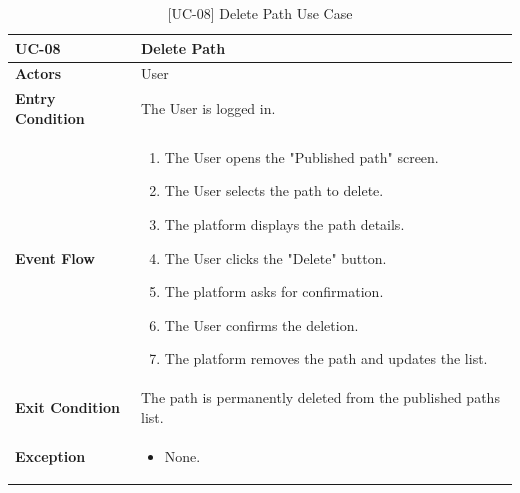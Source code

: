 \begin{table}[H]
    \centering
    \setlength\extrarowheight{2pt}
    \renewcommand{\arraystretch}{1.2}
    \begin{tabularx}{\textwidth}{|>{\bfseries}l|X|}
    \hline
    UC-08 & Delete Path \\ \hline
    Actors & User\\ \hline
    Entry Condition & The User is logged in.\\ \hline
    Event Flow & 
    \begin{enumerate}
      \item The User opens the "Published path" screen.
      \item The User selects the path to delete.
      \item The platform displays the path details.
      \item The User clicks the "Delete" button.
      \item The platform asks for confirmation.
      \item The User confirms the deletion.
      \item The platform removes the path and updates the list.
    \end{enumerate}
    \\ \hline
    Exit Condition &  The path is permanently deleted from the published paths list.\\ \hline
    Exception & 
    \begin{itemize}
        \item None.
    \end{itemize}
    \\ \hline
   \end{tabularx}
   \caption{[UC-08] Delete Path Use Case}
    \label{UC-08}
\end{table}

